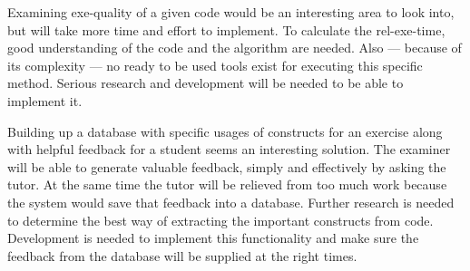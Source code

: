 Examining \gls{exe-quality} of a given \gls{code}
would be an interesting area to look into,
but will take more time and effort to implement.
To calculate the \gls{rel-exe-time},
good understanding of the \gls{code} and the algorithm are needed.
Also --- because of its complexity --- no ready to be used tools exist
for executing this specific method.
Serious research and development will be needed to be able to implement it.

Building up a database with specific usages of \glspl{construct}
for an \gls{exercise} along with helpful \gls{feedback} for a \gls{student}
seems an interesting solution.
The \gls{examiner} will be able to generate valuable \gls{feedback},
simply and effectively by asking the \gls{tutor}.
At the same time the \gls{tutor} will be relieved from too much work
because the system would save that \gls{feedback} into a database.
Further research is needed to determine the best way of
extracting the important \glspl{construct} from \gls{code}.
Development is needed to implement this functionality
and make sure the \gls{feedback} from the database
will be supplied at the right times.

